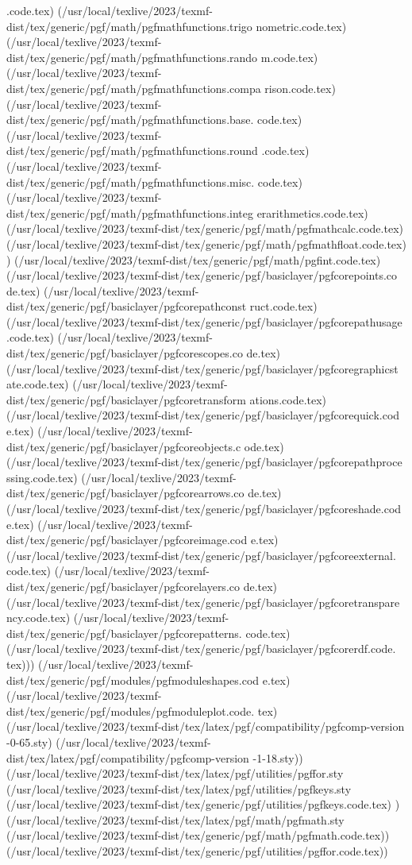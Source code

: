 .code.tex)
(/usr/local/texlive/2023/texmf-dist/tex/generic/pgf/math/pgfmathfunctions.trigo
nometric.code.tex)
(/usr/local/texlive/2023/texmf-dist/tex/generic/pgf/math/pgfmathfunctions.rando
m.code.tex)
(/usr/local/texlive/2023/texmf-dist/tex/generic/pgf/math/pgfmathfunctions.compa
rison.code.tex)
(/usr/local/texlive/2023/texmf-dist/tex/generic/pgf/math/pgfmathfunctions.base.
code.tex)
(/usr/local/texlive/2023/texmf-dist/tex/generic/pgf/math/pgfmathfunctions.round
.code.tex)
(/usr/local/texlive/2023/texmf-dist/tex/generic/pgf/math/pgfmathfunctions.misc.
code.tex)
(/usr/local/texlive/2023/texmf-dist/tex/generic/pgf/math/pgfmathfunctions.integ
erarithmetics.code.tex)
(/usr/local/texlive/2023/texmf-dist/tex/generic/pgf/math/pgfmathcalc.code.tex)
(/usr/local/texlive/2023/texmf-dist/tex/generic/pgf/math/pgfmathfloat.code.tex)
) (/usr/local/texlive/2023/texmf-dist/tex/generic/pgf/math/pgfint.code.tex)
(/usr/local/texlive/2023/texmf-dist/tex/generic/pgf/basiclayer/pgfcorepoints.co
de.tex)
(/usr/local/texlive/2023/texmf-dist/tex/generic/pgf/basiclayer/pgfcorepathconst
ruct.code.tex)
(/usr/local/texlive/2023/texmf-dist/tex/generic/pgf/basiclayer/pgfcorepathusage
.code.tex)
(/usr/local/texlive/2023/texmf-dist/tex/generic/pgf/basiclayer/pgfcorescopes.co
de.tex)
(/usr/local/texlive/2023/texmf-dist/tex/generic/pgf/basiclayer/pgfcoregraphicst
ate.code.tex)
(/usr/local/texlive/2023/texmf-dist/tex/generic/pgf/basiclayer/pgfcoretransform
ations.code.tex)
(/usr/local/texlive/2023/texmf-dist/tex/generic/pgf/basiclayer/pgfcorequick.cod
e.tex)
(/usr/local/texlive/2023/texmf-dist/tex/generic/pgf/basiclayer/pgfcoreobjects.c
ode.tex)
(/usr/local/texlive/2023/texmf-dist/tex/generic/pgf/basiclayer/pgfcorepathproce
ssing.code.tex)
(/usr/local/texlive/2023/texmf-dist/tex/generic/pgf/basiclayer/pgfcorearrows.co
de.tex)
(/usr/local/texlive/2023/texmf-dist/tex/generic/pgf/basiclayer/pgfcoreshade.cod
e.tex)
(/usr/local/texlive/2023/texmf-dist/tex/generic/pgf/basiclayer/pgfcoreimage.cod
e.tex)
(/usr/local/texlive/2023/texmf-dist/tex/generic/pgf/basiclayer/pgfcoreexternal.
code.tex)
(/usr/local/texlive/2023/texmf-dist/tex/generic/pgf/basiclayer/pgfcorelayers.co
de.tex)
(/usr/local/texlive/2023/texmf-dist/tex/generic/pgf/basiclayer/pgfcoretranspare
ncy.code.tex)
(/usr/local/texlive/2023/texmf-dist/tex/generic/pgf/basiclayer/pgfcorepatterns.
code.tex)
(/usr/local/texlive/2023/texmf-dist/tex/generic/pgf/basiclayer/pgfcorerdf.code.
tex)))
(/usr/local/texlive/2023/texmf-dist/tex/generic/pgf/modules/pgfmoduleshapes.cod
e.tex)
(/usr/local/texlive/2023/texmf-dist/tex/generic/pgf/modules/pgfmoduleplot.code.
tex)
(/usr/local/texlive/2023/texmf-dist/tex/latex/pgf/compatibility/pgfcomp-version
-0-65.sty)
(/usr/local/texlive/2023/texmf-dist/tex/latex/pgf/compatibility/pgfcomp-version
-1-18.sty))
(/usr/local/texlive/2023/texmf-dist/tex/latex/pgf/utilities/pgffor.sty
(/usr/local/texlive/2023/texmf-dist/tex/latex/pgf/utilities/pgfkeys.sty
(/usr/local/texlive/2023/texmf-dist/tex/generic/pgf/utilities/pgfkeys.code.tex)
) (/usr/local/texlive/2023/texmf-dist/tex/latex/pgf/math/pgfmath.sty
(/usr/local/texlive/2023/texmf-dist/tex/generic/pgf/math/pgfmath.code.tex))
(/usr/local/texlive/2023/texmf-dist/tex/generic/pgf/utilities/pgffor.code.tex))

